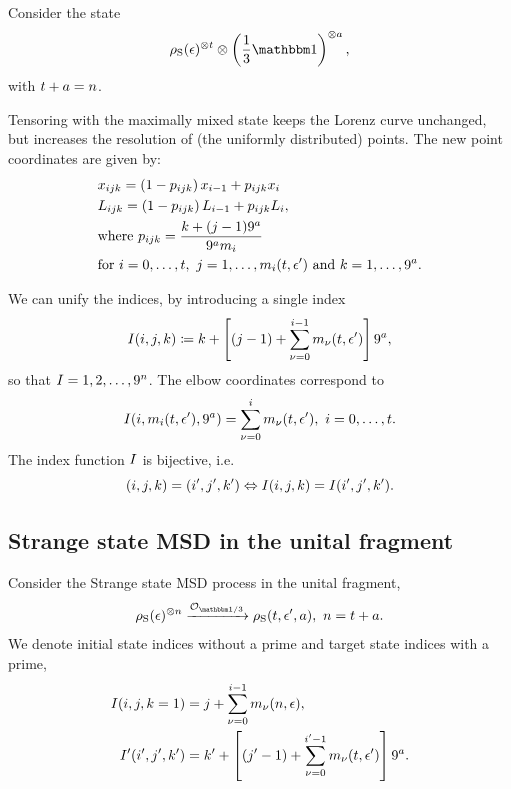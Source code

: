 Consider the state 
\begin{equation*}
    \noisys(\epsilon)\too{\tt} \otimes \left( \frac{1}{3}\id \right)\too{\mm},
\end{equation*} %
with $t + a = n$.

Tensoring with the maximally mixed state keeps the Lorenz curve unchanged, but increases the resolution of (the uniformly distributed) points.
The new point coordinates are given by:
\begin{align}
    &x_{ijk} = \left( 1-p_{ijk}\right) x_{i-1} + p_{ijk} x_{i} \label{eq:lcsu_xcoord}\\
    &L_{ijk} = \left( 1-p_{ijk} \right) L_{i-1} + p_{ijk} L_{i}, \label{eq:lcsu_lcoord}\\
    &\text{where } p_{ijk} = \frac{k + (j-1)9^{a}}{9^{a} m_{i}} \nonumber\\
    &\text{for } i=0,\dots,t,\ j = 1,\dots,m_{i}(t, \epsilon') \text{ and } k = 1,\dots,9^{a}. \nonumber
\end{align}

We can unify the indices, by introducing a single index
\begin{equation}
    I(i,j,k) \coloneqq k + \left[ (j-1) + \sum_{\nu=0}^{i-1} m_{\nu}(t, \epsilon') \right]9^{a},
\end{equation}
so that $I=1,2,\dots, 9^{n}$.
The elbow coordinates correspond to 
\begin{equation}
	I(i, m_{i}(t, \epsilon'), 9^{a}) = \sum_{\nu=0}^{i} m_{\nu}(t, \epsilon'),\ i= 0,\dots,t.
\end{equation}
The index function $I$ is bijective, i.e.
\begin{equation}
	(i,j,k) = (i',j',k') \Leftrightarrow I(i,j,k) = I(i',j',k').
\end{equation}

\subsection{Strange state MSD in the unital fragment}\label{app:lc_compare}
Consider the Strange state MSD process in the unital fragment,
\begin{equation}\label{eq:su_conversion}
    \noisysn \xrightarrow{\mathcal{O}_{\id/3}} \noisys(\tt, \epsilon', \mm),\ \nn = \tt + \mm.
\end{equation}
We denote initial state indices without a prime and target state indices with a prime,
\begin{align}
    I(i,j,k=1) &= j + \sum_{\nu=0}^{i-1} m_{\nu}(n, \epsilon), \\
    I'(i',j',k') &= k' + \left[ (j'-1) + \sum_{\nu=0}^{i'-1} m_{\nu}(t, \epsilon') \right]9^{a}.
\end{align}

